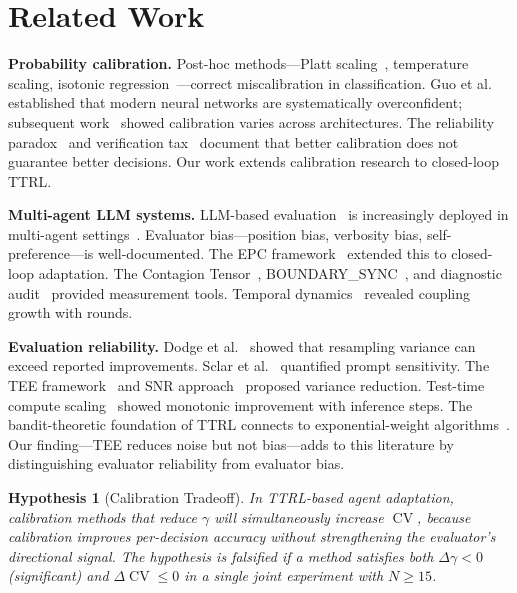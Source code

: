 \documentclass[11pt]{article}
\DeclareMathOperator{\CV}{CV}
\newtheorem{hypothesis}{Hypothesis}
\begin{document}
\section{Related Work}

\textbf{Probability calibration.} Post-hoc methods---Platt scaling~\cite{platt1999probabilistic}, temperature scaling, isotonic regression~\cite{niculescu2005predicting}---correct miscalibration in classification. Guo et al.~\cite{guo2017calibration} established that modern neural networks are systematically overconfident; subsequent work~\cite{minderer2021revisiting} showed calibration varies across architectures. The reliability paradox~\cite{he2026paradox} and verification tax~\cite{mills2026verification} document that better calibration does not guarantee better decisions. Our work extends calibration research to closed-loop TTRL.

\textbf{Multi-agent LLM systems.} LLM-based evaluation~\cite{zheng2023judging,chiang2024chatbot} is increasingly deployed in multi-agent settings~\cite{li2023camel,wu2024autogen}. Evaluator bias---position bias, verbosity bias, self-preference---is well-documented. The EPC framework~\cite{liu2026epc} extended this to closed-loop adaptation. The Contagion Tensor~\cite{liu2026tensor}, BOUNDARY\_SYNC~\cite{liu2026boundarysync}, and diagnostic audit~\cite{liu2026audit} provided measurement tools. Temporal dynamics~\cite{liu2026temporal} revealed coupling growth with rounds.

\textbf{Evaluation reliability.} Dodge et al.~\cite{dodge2019reproducibility} showed that resampling variance can exceed reported improvements. Sclar et al.~\cite{sclar2024quantifying} quantified prompt sensitivity. The TEE framework~\cite{messing2026tee} and SNR approach~\cite{heineman2025snr} proposed variance reduction. Test-time compute scaling~\cite{snell2024scaling} showed monotonic improvement with inference steps. The bandit-theoretic foundation of TTRL connects to exponential-weight algorithms~\cite{bubeck2012regret}. Our finding---TEE reduces noise but not bias---adds to this literature by distinguishing evaluator reliability from evaluator bias.

\begin{hypothesis}[Calibration Tradeoff]
In TTRL-based agent adaptation, calibration methods that reduce $\gamma$ will simultaneously increase $\CV$, because calibration improves per-decision accuracy without strengthening the evaluator's directional signal. The hypothesis is falsified if a method satisfies \textit{both} $\Delta\gamma < 0$ (significant) \textit{and} $\Delta\CV \leq 0$ in a single joint experiment with $N \geq 15$.
\end{hypothesis}
\end{document}
